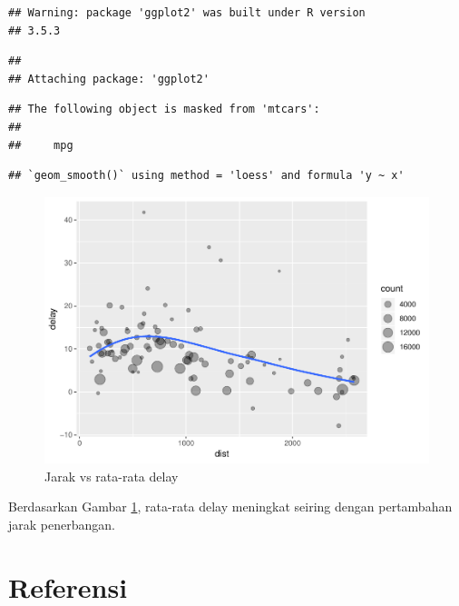 \documentclass[]{book}
\begin{document}
\begin{verbatim}
## Warning: package 'ggplot2' was built under R version
## 3.5.3
\end{verbatim}

\begin{verbatim}
## 
## Attaching package: 'ggplot2'
\end{verbatim}

\begin{verbatim}
## The following object is masked from 'mtcars':
## 
##     mpg
\end{verbatim}

\begin{verbatim}
## `geom_smooth()` using method = 'loess' and formula 'y ~ x'
\end{verbatim}

\begin{figure}

{\centering \includegraphics[width=0.7\linewidth]{EnvStat_files/figure-latex/distvsave-1} 

}

\caption{Jarak vs rata-rata delay}\label{fig:distvsave}
\end{figure}

Berdasarkan Gambar \ref{fig:distvsave}, rata-rata delay meningkat
seiring dengan pertambahan jarak penerbangan.

\section{Referensi}\label{referensi-2}
\end{document}
